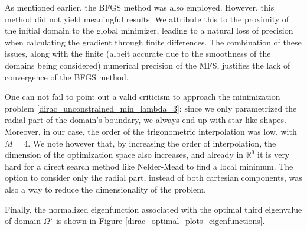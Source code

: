 \begin{figure}[!htb]
\begin{minipage}{.5\textwidth}
        \captionsetup{width=0.8\linewidth} %
        \label{dirac_val_third}
    \end{minipage}
\end{figure}

As mentioned earlier, the \ac{BFGS} method was also employed. However, this method did not yield meaningful results. We attribute this to the proximity of the initial domain to the global minimizer, leading to a natural loss of precision when calculating the gradient through finite differences. The combination of these issues, along with the finite (albeit accurate due to the smoothness of the domains being considered) numerical precision of the \ac{MFS}, justifies the lack of convergence of the \ac{BFGS} method.

\begin{remark}
    One can not fail to point out a valid criticism to approach the minimization problem \eqref{dirac_unconstrained_min_lambda_3}: since we only parametrized the radial part of the domain's boundary, we always end up with star-like shapes. Moreover, in our case, the order of the trigonometric interpolation was low, with \(M=4\). We note however that, by increasing the order of interpolation, the dimension of the optimization space also increases, and already in \(\mathbb{R}^9\) it is very hard for a direct search method like Nelder-Mead to find a local minimum. The option to consider only the radial part, instead of both cartesian components, was also a way to reduce the dimensionality of the problem. 
\end{remark}

Finally, the normalized eigenfunction associated with the optimal third eigenvalue of domain \(\Omega^\star\) is shown in Figure \ref{dirac_optimal_plots_eigenfunctions}.

